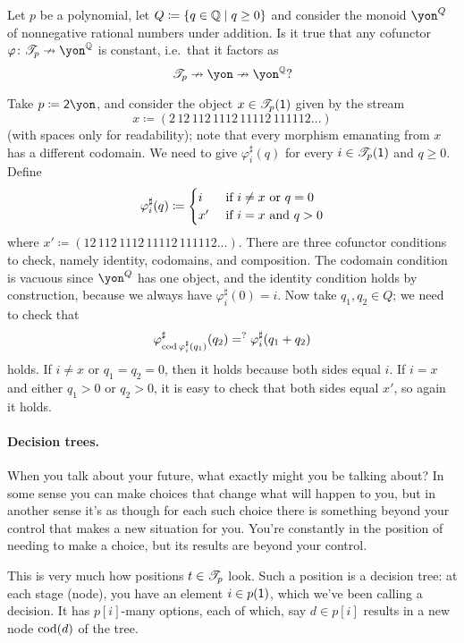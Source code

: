 \documentclass[Book-Poly]{subfiles}
\begin{document}
\begin{exercise}
Let $p$ be a polynomial, let $Q\coloneqq\{q\in\mathbb{Q}\mid q\geq 0\}$ and consider the monoid $\yon^Q$ of nonnegative rational numbers under addition. Is it true that any cofunctor $\varphi\colon\cofree{p}\cof\yon^\qq$ is constant, i.e.\ that it factors as
\[
\cofree{p}\cof\yon\cof\yon^\qq?
\]
\begin{solution}
Take $p\coloneqq\2\yon$, and consider the object $x\in\mathscr{T}_{p}(\textsf{1})$ given by the stream
\[
x\coloneqq(2\,12\,112\,1112\,11112\,111112\ldots)
\]
(with spaces only for readability); note that every morphism emanating from $x$ has a different codomain. We need to give $\varphi^\sharp_i(q)$ for every $i\in\mathscr{T}_{p}(\textsf{1})$ and $q\geq 0$. Define
\[
	\varphi^\sharp_i(q)\coloneqq
	\begin{cases}
		i&\textnormal{ if }i\neq x \textnormal{ or } q=0\\
		x'&\textnormal{ if }i=x\textnormal{ and } q>0
	\end{cases}
\]
where $x'\coloneqq(12\,112\,1112\,11112\,111112\ldots)$. There are three cofunctor conditions to check, namely identity, codomains, and composition. The codomain condition is vacuous since $\yon^Q$ has one object, and the identity condition holds by construction, because we always have $\varphi^\sharp_i(0)=i$. Now take $q_1,q_2\in Q$; we need to check that
\[\varphi^\sharp_{\operatorname{cod}\varphi^\sharp_i(q_1)}(q_2)=^?\varphi^\sharp_i(q_1+q_2)\]
holds. If $i\neq x$ or $q_1=q_2=0$, then it holds because both sides equal $i$. If $i=x$ and either $q_1>0$ or $q_2>0$, it is easy to check that both sides equal $x'$, so again it holds.
\end{solution}
\end{exercise}

\paragraph{Decision trees.}

When you talk about your future, what exactly might you be talking about? In some sense you can make choices that change what will happen to you, but in another sense it's as though for each such choice there is something beyond your control that makes a new situation for you. You're constantly in the position of needing to make a choice, but its results are beyond your control.

This is very much how positions $t\in\mathscr{T}_{p}$ look. Such a position is a decision tree: at each stage (node), you have an element $i\in p(\textsf{1})$, which we've been calling a decision. It has $p[i]$-many options, each of which, say $d\in p[i]$ results in a new node $\operatorname{cod}(d)$ of the tree.
\end{document}
